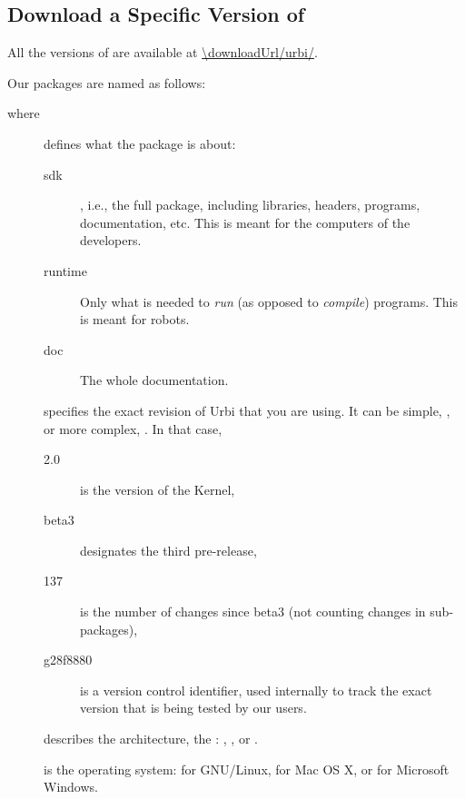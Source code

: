 
\subsection{Download a Specific Version of \urbi}
\label{sec:dl:all}

All the versions of \urbi are available at \url{\downloadUrl/urbi/}.

Our packages are named as follows:
\begin{center}
\end{center}
where
\begin{description}
\item[] defines what the package is about:
  \begin{description}
  \item[sdk] \usdk, i.e., the full package, including libraries, headers,
    programs, documentation, etc.  This is meant for the computers of the
    developers.
  \item[runtime] Only what is needed to \emph{run} (as opposed to
    \emph{compile}) \urbi programs.  This is meant for robots.
  \item[doc] The whole documentation.
  \end{description}
\item[] specifies the exact revision of Urbi that you are
  using.  It can be simple, , or more complex,
  .  In that case,
  \begin{description}
  \item[2.0] is the version of the \urbi Kernel,
  \item[beta3] designates the third pre-release,
  \item[137] is the number of changes since beta3 (not counting
    changes in sub-packages),
  \item[g28f8880] is a version control identifier, used internally to
    track the exact version that is being tested by our users.
  \end{description}
\item[] describes the architecture, the :
  , , or .
\item[] is the operating system:  for GNU/Linux,
   for Mac OS X, or  for Microsoft Windows.

\end{description}
